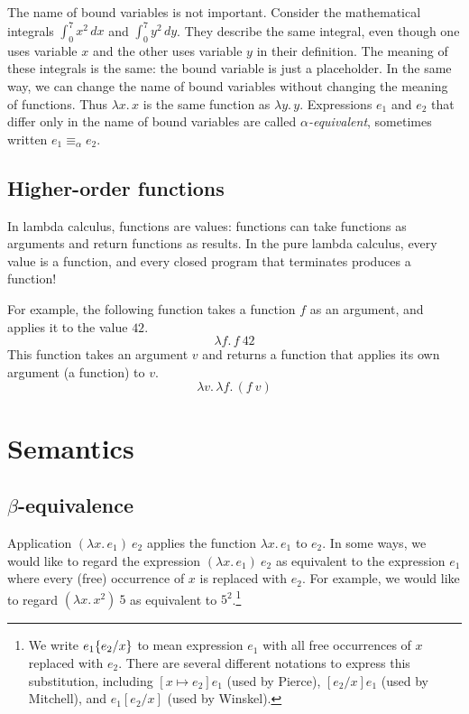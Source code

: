 The name of bound variables is not important. Consider the mathematical integrals
$\int_0^7 x^2\,dx$ and $\int_0^7 y^2\,dy$. They describe the same integral, even though one uses
variable $x$ and the other uses variable $y$ in their definition. The meaning of these integrals is
the same: the bound variable is just a placeholder. In the same way, we can change the name of
bound variables without changing the meaning of functions. Thus $\lambda x.\,x$ is the same
function as $\lambda y.\,y$. Expressions $e_1$ and $e_2$ that differ only in the name of bound
variables are called \emph{$\alpha$-equivalent}, sometimes written $e_1\equiv_\alpha e_2$.

\subsection{Higher-order functions}

In lambda calculus, functions are values: functions can take functions as arguments and return
functions as results. In the pure lambda calculus, every value is a function, and every closed
program that terminates produces a function!

For example, the following function takes a function $f$ as an argument, and applies it to the
value $42$.
\[
  \lambda f.\,f\ 42
\]
This function takes an argument $v$ and returns a function that applies its own argument (a
function) to $v$.
\[
  \lambda v.\,\lambda f.\,(f\ v)
\]

\section{Semantics}

\subsection{$\beta$-equivalence}

Application $(\lambda x.\,e_1)\ e_2$ applies the function $\lambda x.\,e_1$ to $e_2$. In some ways,
we would like to regard the expression $(\lambda x.\,e_1)\ e_2$ as equivalent to the expression
$e_1$ where every (free) occurrence of $x$ is replaced with $e_2$. For example, we would like to
regard $(\lambda x.\,x^2)\ 5$ as equivalent to $5^2$.\footnote{We write $e_1\{e_2/x\}$ to mean
expression $e_1$ with all free occurrences of $x$ replaced with $e_2$. There are several different
notations to express this substitution, including $[x\mapsto e_2]e_1$ (used by Pierce),
$[e_2/x]e_1$ (used by Mitchell), and $e_1[e_2/x]$ (used by Winskel).}

